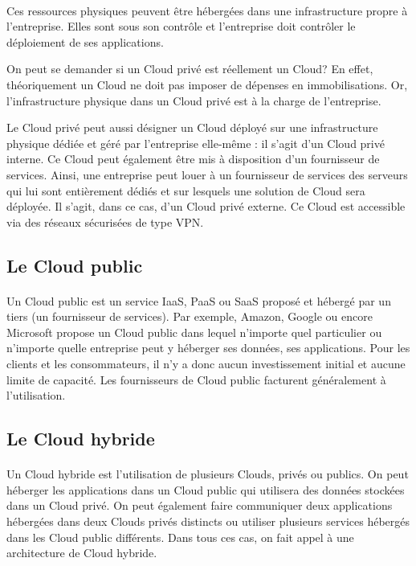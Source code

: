 \documentclass[a4paper,12pt]{report}
\begin{document}
\begin{onehalfspace}
	\paragraph*{}
	Ces ressources physiques peuvent être hébergées dans une infrastructure propre à l’entreprise. Elles sont sous son contrôle et l’entreprise doit contrôler le déploiement de ses applications.
	
	On peut se demander si un Cloud privé est réellement un Cloud? En effet, théoriquement un Cloud ne doit pas imposer de dépenses en immobilisations. Or, l’infrastructure physique dans un Cloud privé est à la charge de l’entreprise.
	
	Le Cloud privé peut aussi désigner un Cloud déployé sur une infrastructure physique dédiée et géré par l’entreprise elle-même : il s’agit d’un Cloud privé interne. Ce Cloud peut également être mis à disposition d’un fournisseur de services. Ainsi, une entreprise peut louer à un fournisseur de services des serveurs qui lui sont entièrement dédiés et sur lesquels une solution de Cloud sera déployée. Il s’agit, dans ce cas, d’un Cloud privé externe. Ce Cloud est accessible via des réseaux sécurisées de type VPN.
	
	\subsection{Le Cloud public}
	
	\paragraph*{}
	Un Cloud public est un service IaaS, PaaS ou SaaS proposé et hébergé par un tiers (un fournisseur de services). Par exemple, Amazon, Google ou encore Microsoft propose un Cloud public dans lequel n’importe quel particulier ou n’importe quelle entreprise peut y héberger ses données, ses applications. Pour les clients et les consommateurs, il n’y a donc aucun investissement initial et aucune limite de capacité. Les fournisseurs de Cloud public facturent généralement à l’utilisation.	
	
	\subsection{Le Cloud hybride}
	
	\paragraph*{}
	Un Cloud hybride est l’utilisation de plusieurs Clouds, privés ou publics.
On peut héberger les applications dans un Cloud public qui utilisera des données stockées dans un Cloud privé. On peut également faire communiquer deux applications hébergées dans deux Clouds privés distincts ou utiliser plusieurs services hébergés dans les Cloud public différents. Dans tous ces cas, on fait appel à une architecture de Cloud hybride.
	

\end{onehalfspace}
\end{document}
